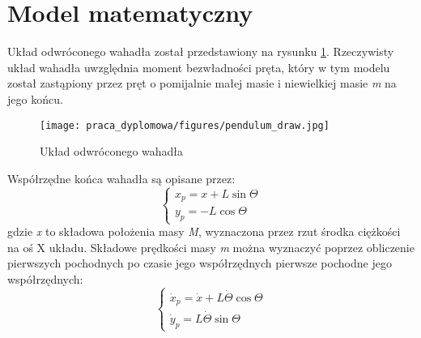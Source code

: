 \section{Model matematyczny} \label{sec:modelmat}

Układ odwróconego wahadła został przedstawiony na rysunku \ref{fig:draw}. Rzeczywisty układ wahadła uwzględnia moment bezwładności pręta, który w tym modelu został zastąpiony przez pręt o pomijalnie małej masie i niewielkiej masie \textit{m} na jego końcu. 

\begin{figure}
    \centering
    \texttt{[image: praca\_dyplomowa/figures/pendulum\_draw.jpg]}
    \caption{Układ odwróconego wahadła}
    \label{fig:draw}
\end{figure}

Współrzędne końca wahadła są opisane przez:
\begin{equation}
    \begin{cases}
    x_{p}=x+L\sin{\Theta}\\ 
    y_{p}=-L\cos{\Theta}
    \end{cases}
\end{equation}
gdzie \textit{x} to składowa położenia masy \textit{M}, wyznaczona przez rzut środka ciężkości na oś X układu. Składowe prędkości masy \textit{m} można wyznaczyć poprzez obliczenie pierwszych pochodnych po czasie jego współrzędnych pierwsze pochodne jego współrzędnych: 
\begin{equation}
    \begin{cases}
    \dot{x}_{p}=\dot{x}+L\dot{\Theta}\cos{\Theta}\\
    \dot{y}_{p}=L\dot{\Theta}\sin{\Theta}
    \end{cases}
    \label{skladowe}
\end{equation}


